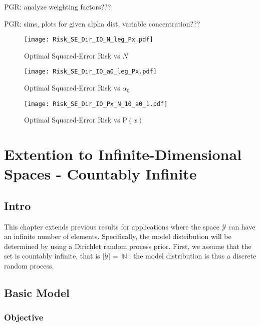 \documentclass[12pt]{report}
\begin{document}
PGR: analyze weighting factors???

PGR: sims, plots for given alpha dist, variable concentration???


\begin{figure}
\centering
\texttt{[image: Risk\_SE\_Dir\_IO\_N\_leg\_Px.pdf]}
\caption{Optimal Squared-Error Risk vs $N$}
\label{fig:Risk_SE_Dir_IO_N_leg_Px}
\end{figure}

\begin{figure}
\centering
\texttt{[image: Risk\_SE\_Dir\_IO\_a0\_leg\_Px.pdf]}
\caption{Optimal Squared-Error Risk vs $\alpha_0$}
\label{fig:Risk_SE_Dir_IO_a0_leg_Px}
\end{figure}

\begin{figure}
\centering
\texttt{[image: Risk\_SE\_Dir\_IO\_Px\_N\_10\_a0\_1.pdf]}
\caption{Optimal Squared-Error Risk vs $\text{P}(x)$}
\label{fig:Risk_SE_Dir_IO_Px_N_10_a0_1}
\end{figure}








\chapter{Extention to Infinite-Dimensional Spaces - Countably Infinite}


\section{Intro}

This chapter extends previous results for applications where the space $\mathcal{Y}$ can have an infinite number of elements. Specifically, the model distribution will be determined by using a Dirichlet random process prior. First, we assume that the set is countably infinite, that is $|\mathcal{Y}| = |\mathbb{N}|$; the model distribution is thus a discrete random process. 




\section{Basic Model}


\subsection{Objective}
\end{document}
